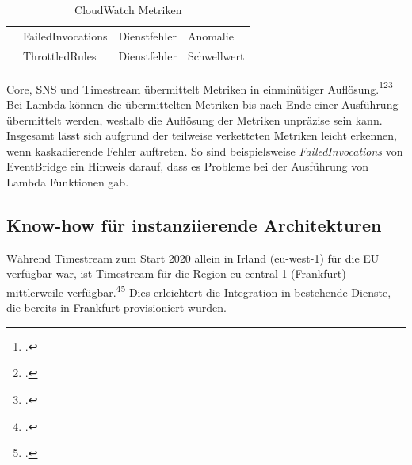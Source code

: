 \begin{table}[H]
\begin{tabular}{|l|l|l|l|}
\rowcolor[HTML]{F5F5F5} 
\cellcolor[HTML]{F5F5F5} & FailedInvocations & Dienstfehler & Anomalie \\ \cline{2-4} 
\rowcolor[HTML]{F5F5F5} 
\multirow{-2}{*}{EventBridge} & ThrottledRules & Dienstfehler & Schwellwert \\ \hline
\end{tabular}
\caption{CloudWatch Metriken}
\label{tab:cloudwatch-metrics-db}
\end{table}

\AWSIOT{} Core, \ac{SNS} und Timestream übermittelt Metriken in einminütiger Auflösung.\footcite[Vgl.][]{AmazonWebServicesInc..o.J.az}\nzitat\footcite[Vgl.][]{AmazonWebServicesInc..2021b}\nzitat\footcite[Vgl.][]{AmazonWebServicesInc..o.J.be} 
Bei Lambda können die übermittelten Metriken bis nach Ende einer Ausführung übermittelt werden, weshalb die Auflösung der Metriken unpräzise sein kann. Insgesamt lässt sich aufgrund der teilweise verketteten Metriken leicht erkennen, wenn kaskadierende Fehler auftreten. So sind beispielsweise \textit{FailedInvocations} von EventBridge ein Hinweis darauf, dass es Probleme bei der Ausführung von Lambda Funktionen gab.



\subsection{Know-how für instanziierende Architekturen}
Während Timestream zum Start 2020 allein in Irland (eu-west-1) für die EU verfügbar war, ist Timestream für die Region eu-central-1 (Frankfurt) mittlerweile verfügbar.\footcite[Vgl.][]{AmazonWebServicesInc..2020g}\nzitat\footcite[Vgl.][]{AmazonWebServicesInc..o.J.q} Dies erleichtert die Integration in bestehende Dienste, die bereits in Frankfurt provisioniert wurden.

